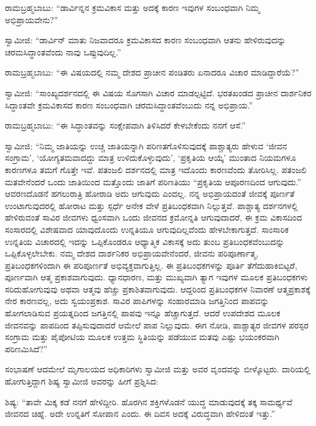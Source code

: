  ರಾಮಬ್ರಹ್ಮಬಾಬು: “ಡಾರ್ವಿನ್ನನ ಕ್ರಮವಿಕಾಸ ಮತ್ತು ಅದಕ್ಕೆ ಕಾರಣ ಇವುಗಳ ಸಂಬಂಧವಾಗಿ ನಿಮ್ಮ ಅಭಿಪ್ರಾಯವೇನು?” 

 ಸ್ವಾಮೀಜಿ: “ಡಾರ್ವಿನ್ ಮಾತು ನಿಜವಾದರೂ ಕ್ರಮವಿಕಾಸದ ಕಾರಣ ಸಂಬಂಧವಾಗಿ ಆತನು ಹೇಳಿರುವುದನ್ನು ಚರಮಸಿದ್ಧಾಂತವೆಂದು ನಾವು ಒಪ್ಪುವುದಿಲ್ಲ.” 

 ರಾಮಬ್ರಹ್ಮಬಾಬು: “ಈ ವಿಷಯದಲ್ಲಿ ನಮ್ಮ ದೇಶದ ಪ್ರಾಚೀನ ಪಂಡಿತರು ಏನಾದರೂ ವಿಚಾರ ಮಾಡಿದ್ದಾರೆಯೆ?” 

 ಸ್ವಾಮೀಜಿ: “ಸಾಂಖ್ಯದರ್ಶನದಲ್ಲಿ ಈ ವಿಷಯ ಸೊಗಸಾಗಿ ವಿಚಾರ ಮಾಡಲ್ಪಟ್ಟಿದೆ. ಭರತಖಂಡದ ಪ್ರಾಚೀನ ದಾರ್ಶನಿಕರ ಸಿದ್ಧಾಂತವೇ ಕ್ರಮವಿಕಾಸದ ಕಾರಣ ಸಂಬಂಧವಾಗಿ ಚರಮಸಿದ್ಧಾಂತವೆಂಬುದು ನನ್ನ ಅಭಿಪ್ರಾಯ.” 

 ರಾಮಬ್ರಹ್ಮಬಾಬು: “ಈ ಸಿದ್ಧಾಂತವನ್ನು ಸಂಕ್ಷೇಪವಾಗಿ ತಿಳಿಸಿದರೆ ಕೇಳಬೇಕೆಂದು ನನಗೆ ಆಸೆ.” 

 ಸ್ವಾಮೀಜಿ: “ನಿಮ್ಮ ಜಾತಿಯನ್ನು ಉಚ್ಚ ಜಾತಿಯನ್ನಾಗಿ ಪರಿಣತಗೊಳಿಸುವುದಕ್ಕೆ ಪಾಶ್ಚಾತ್ಯರು ಹೇಳುವ ‘ಜೀವನ ಸಂಗ್ರಾಮ’, ‘ಯೋಗ್ಯತಮವಾದದ್ದು ಮಾತ್ರ ಉಳಿದುಕೊಳ್ಳುವುದು’, ‘ಪ್ರಕೃತಿಯ ಆಯ್ಕೆ’ ಮುಂತಾದ ನಿಯಮಗಳೂ ಕಾರಣಗಳೂ ತಮಗೆ ಗೊತ್ತೇ ಇವೆ. ಪತಂಜಲಿ ದರ್ಶನದಲ್ಲಿ ಮಾತ್ರ ಇದೊಂದು ಕಾರಣವೆಂದು ತೋರಿಸಿಲ್ಲ. ಪತಂಜಲಿ ಮತವೇನೆಂದರೆ ಒಂದು ಜಾತಿಯಿಂದ ಮತ್ತೊಂದು ಜಾತಿಗೆ ಪರಿಣತಿಯು “ಪ್ರಕೃತಿಯ ಆಪೂರಣದಿಂದ ಆಗುವುದು.” ಆವರಣದೊಡನೆ ಹಗಲುರಾತ್ರಿ ಹೋರಾಡಿ ಅದು ಆಗುವುದು ಎಂದಲ್ಲ. ನನ್ನ ಅಭಿಪ್ರಾಯದಂತೆ ಜೀವಕ್ಕೆ ಪೂರ್ಣತೆ ಉಂಟಾಗುವುದರಲ್ಲಿ ಹೋರಾಟ ಮತ್ತು ಸ್ಪರ್ಧೆ ಅನೇಕ ವೇಳೆ ಪ್ರತಿಬಂಧಕವಾಗಿ ನಿಲ್ಲುತ್ತವೆ. ಪಾಶ್ಚಾತ್ಯ ದರ್ಶನಗಳಲ್ಲಿ ಹೇಳಿರುವಂತೆ ಸಾವಿರ ಜೀವಗಳು ಧ್ವಂಸವಾಗಿ ಒಂದು ಜೀವನದ ಕ್ರಮೋನ್ನತಿ ಆಗುವುದಾದರೆ, ಈ ಕ್ರಮ ವಿಕಾಸದಿಂದ ಸಂಸಾರದಲ್ಲಿ ವಿಶೇಷವಾದ ಯಾವುದೊಂದು ಉನ್ನತಿಯೂ ಆಗುವುದಿಲ್ಲವೆಂದು ಹೇಳಬೇಕಾಗುತ್ತದೆ. ಸಾಂಸಾರಿಕ ಉನ್ನತಿಯ ವಿಚಾರದಲ್ಲಿ ಇದನ್ನು ಒಪ್ಪಿಕೊಂಡರೂ ಆಧ್ಯಾತ್ಮಿಕ ವಿಕಾಸಕ್ಕೆ ಅದು ತುಂಬ ಪ್ರತಿಬಂಧಕವೆಂಬುದನ್ನು ಒಪ್ಪಿಕೊಳ್ಳಲೇಬೇಕು. ನಮ್ಮ ದೇಶದ ದಾರ್ಶನಿಕರ ಅಭಿಪ್ರಾಯವೇನೆಂದರೆ, ಜೀವನು ಪರಿಪೂರ್ಣಾತ್ಮ, ಪ್ರತಿಬಂಧಕಗಳಿಂದಾಗಿ ಈ ಪರಿಪೂರ್ಣತೆ ಅಭಿವ್ಯಕ್ತವಾಗುತ್ತಿಲ್ಲ. ಈ ಪ್ರತಿಬಂಧಕಗಳನ್ನು ಪೂರ್ತಿ ತೆಗೆದುಹಾಕಿಬಿಟ್ಟರೆ, ಪೂರ್ಣವಾಗಿ ಆತ್ಮ ಪ್ರಕಾಶವಾಗುವುದು. ಧ್ಯಾನಧಾರಣ, ಮತ್ತು ಮುಖ್ಯವಾಗಿ ತ್ಯಾಗ ಇವುಗಳ ಮೂಲಕ ಪ್ರತಿಬಂಧಕಗಳು ಸರಿದುಹೋಗುವುವು ಅಥವಾ ಆತ್ಮವು ಹೆಚ್ಚು ಪ್ರಕಾಶಿತವಾಗುವುದು. ಆದ್ದರಿಂದ ಪ್ರತಿಬಂಧಕಗಳ ನಿವಾರಣೆ ಆತ್ಮಪ್ರಕಾಶಕ್ಕೆ ನೇರ ಕಾರಣವಲ್ಲ, ಅದು ಸ್ವಯಂಪ್ರಕಾಶ. ಸಾವಿರ ಪಾಪಿಗಳನ್ನು ಸಂಹಾರಮಾಡಿ ಜಗತ್ತಿನಿಂದ ಪಾಪವನ್ನು ಹೋಗಲಾಡಿಸುವ ಪ್ರಯತ್ನದಿಂದ ಜಗತ್ತಿನಲ್ಲಿ ಪಾಪವು ಇನ್ನೂ ಹೆಚ್ಚಾಗುತ್ತದೆ. ಆದರೆ ಉಪದೇಶದ ಮೂಲಕ ಜೀವನವನ್ನು ಪಾಪದಿಂದ ತಪ್ಪಿಸುವುದಾದರೆ ಆಮೇಲೆ ಪಾಪ ನಿಲ್ಲುವುದು. ಈಗ ನೋಡಿ, ಪಾಶ್ಚಾತ್ಯರ ಜೀವಗಳ ಪರಸ್ಪರ ಸಂಗ್ರಾಮ ಮತ್ತು ಪೈಪೋಟಿಯ ಮೂಲಕ ಉತ್ತಮ ಸ್ಥಿತಿಯನ್ನು ಪಡೆಯುವ ಮತವು ಎಷ್ಟು ಭಯಂಕರವಾಗಿ ಪರಿಣಮಿಸಿದೆ?” 

 ಸಂಭಾಷಣೆ ಆದಮೇಲೆ ಮೃಗಾಲಯದ ಅಧಿಕಾರಿಗಳು ಸ್ವಾಮೀಜಿ ಮತ್ತು ಅವರ ವೃಂದವನ್ನು ಬೀಳ್ಕೊಟ್ಟರು. ದಾರಿಯಲ್ಲಿ ಹೋಗುತ್ತಿದ್ದಾಗ ಶಿಷ್ಯ ಸ್ವಾಮೀಜಿ ಅವರನ್ನು ಹೀಗೆ ಪ್ರಶ್ನಿಸಿದ: 

 ಶಿಷ್ಯ: “ತಾವೇ ಮಿಕ್ಕ ಕಡೆ ನನಗೆ ಹೇಳಿದ್ದೀರಿ. ಹೊರಗಿನ ಶಕ್ತಿಗಳೊಡನೆ ಯುದ್ಧ ಮಾಡುವುದಕ್ಕೆ ತಕ್ಕ ಸಾಮರ್ಥ್ಯವೆ ಜೀವನದ ಚಿಹ್ನೆ. ಅದೇ ಉನ್ನತಿಗೆ ಸೋಪಾನ ಎಂದು. ಈ ದಿವಸ ಅದಕ್ಕೆ ವಿರುದ್ಧವಾಗಿ ಹೇಳಿದಂತೆ ಇತ್ತು.” 

